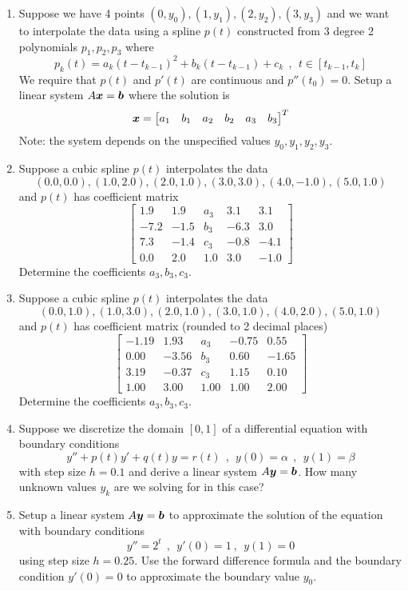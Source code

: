 \begin{enumerate}[leftmargin=*]
\item Suppose we have 4 points $(0,y_0),(1,y_1),(2,y_2),(3,y_3)$ and we want to interpolate the data using a spline $p(t)$ constructed from $3$ degree 2 polynomials $p_1,p_2,p_3$ where
$$
p_k(t) = a_k(t - t_{k-1})^2 + b_k(t - t_{k-1}) + c_k \ \ , \ \ t \in [t_{k-1},t_k]
$$
We require that $p(t)$ and $p'(t)$ are continuous and $p''(t_0)=0$. Setup a linear system $A \boldsymbol{x} = \boldsymbol{b}$ where the solution is
$$
\boldsymbol{x} = \begin{bmatrix} a_1 & b_1 & a_2 & b_2 & a_3 & b_3 \end{bmatrix}^T
$$
Note: the system depends on the unspecified values $y_0,y_1,y_2,y_3$.

\item Suppose a cubic spline $p(t)$ interpolates the data
$$
(0.0,0.0),(1.0,2.0),(2.0,1.0),(3.0,3.0),(4.0,-1.0),(5.0,1.0)
$$
and $p(t)$ has coefficient matrix
$$
\left[ \begin{array}{rrrrr}
1.9 & 1.9 & a_3 & 3.1 & 3.1 \\
-7.2 & -1.5 & b_3 & -6.3 & 3.0 \\
7.3 & -1.4 & c_3 & -0.8 & -4.1 \\
0.0 & 2.0 & 1.0 & 3.0 & -1.0
\end{array}\right]
$$
Determine the coefficients $a_3,b_3,c_3$.

\item Suppose a cubic spline $p(t)$ interpolates the data
$$
(0.0,1.0),(1.0,3.0),(2.0,1.0),(3.0,1.0),(4.0,2.0),(5.0,1.0)
$$
and $p(t)$ has coefficient matrix (rounded to 2 decimal places)
$$
\left[\begin{array}{rrrrr}
-1.19 & 1.93 & a_3 & -0.75 & 0.55 \\
0.00 & -3.56 & b_3 & 0.60 & -1.65 \\
3.19 & -0.37 & c_3 & 1.15 & 0.10\\
1.00 & 3.00 & 1.00 & 1.00 & 2.00
\end{array} \right]
$$
Determine the coefficients $a_3,b_3,c_3$.

\item Suppose we discretize the domain $[0,1]$ of a differential equation with boundary conditions
$$
y'' + p(t)y' + q(t)y = r(t) \ \ , \ \ y(0) = \alpha \ \ , \ \ y(1) = \beta
$$ 
with step size $h=0.1$ and derive a linear system $A \boldsymbol{y} = \boldsymbol{b}$. How many unknown values $y_k$ are we solving for in this case?

\item Setup a linear system $A \boldsymbol{y} = \boldsymbol{b}$ to approximate the solution of the equation with boundary conditions
$$
y'' = 2^t \ \ , \ \ y'(0) = 1 \ , \ \ y(1) = 0
$$
using step size $h=0.25$. Use the forward difference formula and the boundary condition $y'(0)=0$ to approximate the boundary value $y_0$.


\end{enumerate}
